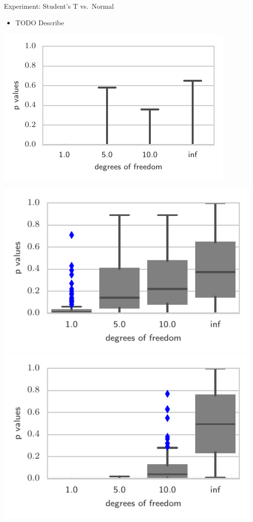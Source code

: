\begin{frame}
\begin{columns}
\hspace{-1.45cm}
\begin{column}{.32\linewidth}
\vspace{-0.75cm}
\begin{block}{Experiment: Student's T vs.\ Normal}
\begin{minipage}{.60\linewidth}
\begin{itemize}
\item TODO Describe
\end{itemize}
\includegraphics[width=.7\textwidth]{img/sgld_student_bad}
\end{minipage}
\begin{minipage}{.35\linewidth}
\includegraphics[width=1\textwidth]{img/sgld_student}\\
 \includegraphics[width=1\textwidth]{img/sgld_student_opt} 

\end{minipage}
\end{block}
\end{column}
\end{columns}
\end{frame}

